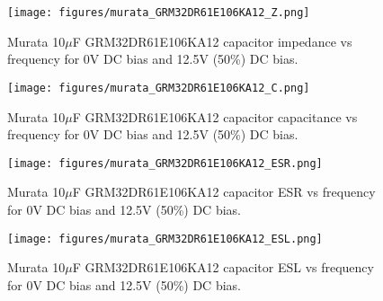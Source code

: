 \documentclass[10pt,twoside]{article}
\begin{document}
\begin{figure}[p]
  \begin{center}
    \texttt{[image: figures/murata\_GRM32DR61E106KA12\_Z.png]}
  \end{center}
  \caption{Murata 10$\mu$F GRM32DR61E106KA12 capacitor impedance vs frequency for 0V DC bias and 12.5V (50\%) DC bias.}
  \label{fig:murata_Z}
\end{figure}

\begin{figure}[p]
  \begin{center}
    \texttt{[image: figures/murata\_GRM32DR61E106KA12\_C.png]}
  \end{center}
  \caption{Murata 10$\mu$F GRM32DR61E106KA12 capacitor capacitance vs frequency for 0V DC bias and 12.5V (50\%) DC bias.}
  \label{fig:murata_C}
\end{figure}

\begin{figure}[p]
  \begin{center}
    \texttt{[image: figures/murata\_GRM32DR61E106KA12\_ESR.png]}
  \end{center}
  \caption{Murata 10$\mu$F GRM32DR61E106KA12 capacitor ESR vs frequency for 0V DC bias and 12.5V (50\%) DC bias.}
  \label{fig:murata_ESR}
\end{figure}

\begin{figure}[p]
  \begin{center}
    \texttt{[image: figures/murata\_GRM32DR61E106KA12\_ESL.png]}
  \end{center}
  \caption{Murata 10$\mu$F GRM32DR61E106KA12 capacitor ESL vs frequency for 0V DC bias and 12.5V (50\%) DC bias.}
  \label{fig:murata_ESL}
\end{figure}

\end{document}
